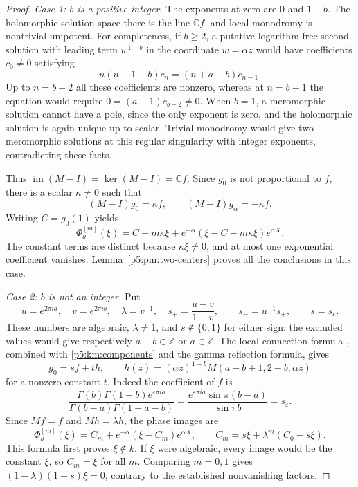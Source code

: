 \documentclass[11pt,a4paper]{article}
\theoremstyle{definition}
\theoremstyle{remark}
\numberwithin{equation}{section}
\begin{document}
\begin{proof}
\emph{Case 1: $b$ is a positive integer.}
The exponents at zero are $0$ and $1-b$.  The holomorphic solution
space there is the line $\mathbb C f$, and local monodromy is
nontrivial unipotent.  For completeness, if $b\ge2$, a putative
logarithm-free second solution with leading term $w^{1-b}$ in the
coordinate $w=\alpha z$ would
have coefficients $c_0\ne0$ satisfying
\[
 n(n+1-b)c_n=(n+a-b)c_{n-1}.
\]
Up to $n=b-2$ all these coefficients are nonzero, whereas at
$n=b-1$ the equation would require
$0=(a-1)c_{b-2}\ne0$.  When $b=1$, a meromorphic solution cannot
have a pole, since the only exponent is zero, and the holomorphic
solution is again unique up to scalar.  Trivial monodromy would
give two meromorphic solutions at this regular singularity with
integer exponents, contradicting these facts.

Thus $\operatorname{im}(M-I)=\ker(M-I)=\mathbb C f$.
Since $g_0$ is not proportional to $f$, there is a scalar
$\kappa\ne0$ such that
\[
 (M-I)g_0=\kappa f,\qquad (M-I)g_\alpha=-\kappa f.
\]
Writing $C=g_0(1)$ yields
\begin{equation}\label{p5:km:integer-orbit}
 \Phi_\theta^{[m]}(\xi)
   =C+m\kappa\xi+e^{-\alpha}(\xi-C-m\kappa\xi)e^{\alpha X}.
\end{equation}
The constant terms are distinct because $\kappa\xi\ne0$, and at
most one exponential coefficient vanishes.  Lemma~\ref{p5:pm:two-centers}
proves all the conclusions in this case.

\emph{Case 2: $b$ is not an integer.}
Put
\[
 u=e^{2\pi ia},\quad v=e^{2\pi ib},\quad\lambda=v^{-1},
 \quad s_+=\frac{u-v}{1-v},\qquad s_-=u^{-1}s_+,
 \qquad s=s_\varepsilon.
\]
These numbers are algebraic, $\lambda\ne1$, and
$s\notin\{0,1\}$ for either sign: the excluded values would give respectively
$a-b\in\mathbb Z$ or $a\in\mathbb Z$.
The local connection formula \cite[13.2.42]{p5:DLMF}, combined with
\eqref{p5:km:components} and the gamma reflection formula, gives
\[
 g_0=s f+t h,\qquad
 h(z)=(\alpha z)^{1-b}M(a-b+1,2-b,\alpha z)
\]
for a nonzero constant $t$.  Indeed the coefficient of $f$ is
\[
 \frac{\Gamma(b)\Gamma(1-b)e^{\varepsilon\pi ia}}
      {\Gamma(b-a)\Gamma(1+a-b)}
   =\frac{e^{\varepsilon\pi ia}\sin\pi(b-a)}{\sin\pi b}
   =s_\varepsilon.
\]
Since $Mf=f$ and $Mh=\lambda h$, the phase images are
\begin{equation}\label{p5:km:finite-orbit}
 \Phi_\theta^{[m]}(\xi)=C_m+e^{-\alpha}(\xi-C_m)e^{\alpha X},
 \qquad C_m=s\xi+\lambda^m(C_0-s\xi).
\end{equation}
This formula first proves $\xi\notin k$.  If $\xi$ were algebraic,
every image would be the constant $\xi$, so $C_m=\xi$ for all
$m$.  Comparing $m=0,1$ gives $(1-\lambda)(1-s)\xi=0$,
contrary to the established nonvanishing factors.


\end{proof}
\end{document}

